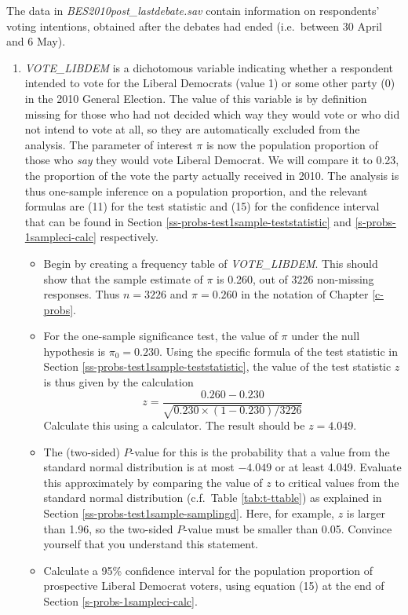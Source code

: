 \documentclass[11pt,a4paper,openany]{book}
\begin{document}
The data in \emph{BES2010post\_lastdebate.sav} contain information on
respondents' voting intentions, obtained after the debates had ended
(i.e.~between 30 April and 6 May).

\begin{enumerate}
\def\labelenumi{\arabic{enumi}.}
\item
  \emph{VOTE\_LIBDEM} is a dichotomous variable indicating whether a
  respondent intended to vote for the Liberal Democrats (value 1) or
  some other party (0) in the 2010 General Election. The value of this
  variable is by definition missing for those who had not decided which
  way they would vote or who did not intend to vote at all, so they are
  automatically excluded from the analysis. The parameter of interest
  \(\pi\) is now the population proportion of those who \emph{say} they
  would vote Liberal Democrat. We will compare it to 0.23, the
  proportion of the vote the party actually received in 2010. The
  analysis is thus one-sample inference on a population proportion, and
  the relevant formulas are (11) for the test statistic and (15) for the
  confidence interval that can be found in Section
  \ref{ss-probs-test1sample-teststatistic} and
  \ref{s-probs-1sampleci-calc} respectively.

  \begin{itemize}
  \item
    Begin by creating a frequency table of \emph{VOTE\_LIBDEM}. This
    should show that the sample estimate of \(\pi\) is 0.260, out of
    \(3226\) non-missing responses. Thus \(n=3226\) and
    \(\hat{\pi}=0.260\) in the notation of Chapter \ref{c-probs}.
  \item
    For the one-sample significance test, the value of \(\pi\) under the
    null hypothesis is \(\pi_{0}=0.230\). Using the specific formula of
    the test statistic in Section
    \ref{ss-probs-test1sample-teststatistic}, the value of the test
    statistic \(z\) is thus given by the calculation
    \[z = \frac{0.260-0.230}{\sqrt{0.230\times (1-0.230)/3226}}\]
    Calculate this using a calculator. The result should be \(z=4.049\).
  \item
    The (two-sided) \(P\)-value for this is the probability that a value
    from the standard normal distribution is at most \(-4.049\) or at
    least 4.049. Evaluate this approximately by comparing the value of
    \(z\) to critical values from the standard normal distribution
    (c.f.~Table \ref{tab:t-ttable}) as explained in Section
    \ref{ss-probs-test1sample-samplingd}. Here, for example, \(z\) is
    larger than 1.96, so the two-sided \(P\)-value must be smaller than
    0.05. Convince yourself that you understand this statement.
  \item
    Calculate a 95\% confidence interval for the population proportion
    of prospective Liberal Democrat voters, using equation (15) at the
    end of Section \ref{s-probs-1sampleci-calc}.
  \end{itemize}


\end{enumerate}
\end{document}
